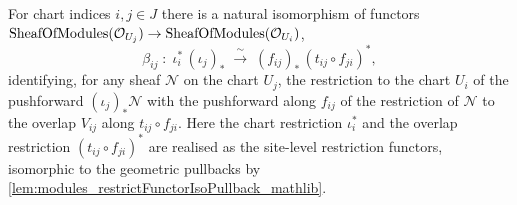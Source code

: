 \begin{lemma}

  \label{lem:glueOverlapBaseChangeIso}
  For chart indices \(i, j \in J\) there is a natural isomorphism of functors
  \(\mathrm{SheafOfModules}(\mathcal{O}_{U_j}) \to \mathrm{SheafOfModules}(\mathcal{O}_{U_i})\),
  \[
    \beta_{ij} \;:\;
      \iota_i^{*}\,(\iota_j)_{*}
        \;\xrightarrow{\ \sim\ }\;
      (f_{ij})_{*}\,(t_{ij} \circ f_{ji})^{*},
  \]
  identifying, for any sheaf \(\mathcal{N}\) on the chart \(U_j\), the restriction to
  the chart \(U_i\) of the pushforward \((\iota_j)_{*}\mathcal{N}\) with the
  pushforward along \(f_{ij}\) of the restriction of \(\mathcal{N}\) to the overlap
  \(V_{ij}\) along \(t_{ij} \circ f_{ji}\). Here the chart restriction \(\iota_i^{*}\)
  and the overlap restriction \((t_{ij} \circ f_{ji})^{*}\) are realised as the
  site-level restriction functors, isomorphic to the geometric pullbacks by
  \cref{lem:modules_restrictFunctorIsoPullback_mathlib}.
\end{lemma}
